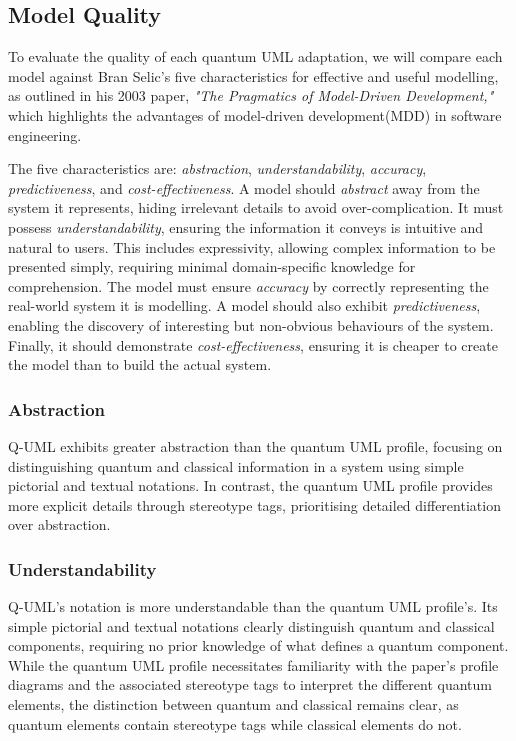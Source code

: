 \documentclass{article}
\begin{document}
\subsection{Model Quality}

To evaluate the quality of each quantum UML adaptation, we will compare each model against Bran Selic's five characteristics for effective and useful modelling, as outlined in his 2003 paper, \textit{"The Pragmatics of Model-Driven Development,"} which highlights the advantages of model-driven development(MDD) in software engineering\cite{1231146}.

The five characteristics are: \textit{abstraction}, \textit{understandability}, \textit{accuracy}, \textit{predictiveness}, and \textit{cost-effectiveness}. A model should \textit{abstract} away from the system it represents, hiding irrelevant details to avoid over-complication. It must possess \textit{understandability}, ensuring the information it conveys is intuitive and natural to users. This includes expressivity, allowing complex information to be presented simply, requiring minimal domain-specific knowledge for comprehension. The model must ensure \textit{accuracy} by correctly representing the real-world system it is modelling. A model should also exhibit \textit{predictiveness}, enabling the discovery of interesting but non-obvious behaviours of the system. Finally, it should demonstrate \textit{cost-effectiveness}, ensuring it is cheaper to create the model than to build the actual system\cite{1231146}.

\subsubsection{Abstraction}

Q-UML exhibits greater abstraction than the quantum UML profile, focusing on distinguishing quantum and classical information in a system using simple pictorial and textual notations. In contrast, the quantum UML profile provides more explicit details through stereotype tags, prioritising detailed differentiation over abstraction.

\subsubsection{Understandability}

Q-UML's notation is more understandable than the quantum UML profile's. Its simple pictorial and textual notations clearly distinguish quantum and classical components, requiring no prior knowledge of what defines a quantum component. While the quantum UML profile necessitates familiarity with the paper's profile diagrams and the associated stereotype tags to interpret the different quantum elements, the distinction between quantum and classical remains clear, as quantum elements contain stereotype tags while classical elements do not.
\end{document}
